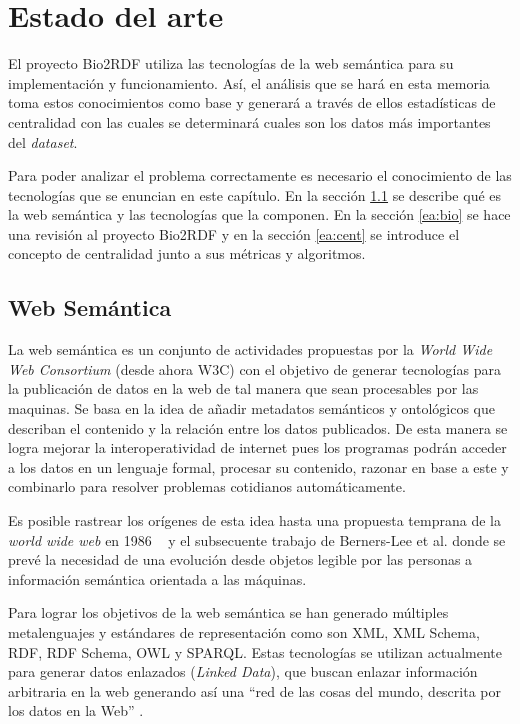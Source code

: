 
\chapter{Estado del arte}
El proyecto Bio2RDF utiliza las tecnologías de la web semántica para su
implementación y funcionamiento. Así, el análisis que se hará en esta memoria
toma estos conocimientos como base y generará a través de ellos estadísticas de
centralidad con las cuales se determinará cuales son los datos más importantes
del \emph{dataset}.

Para poder analizar el problema correctamente es necesario el conocimiento de
las tecnologías que se enuncian en este capítulo. En la sección \ref{ea:ws} se
describe qué es la web semántica y las tecnologías que la componen.
En la sección \ref{ea:bio} se hace una revisión al proyecto Bio2RDF y en la
sección \ref{ea:cent} se introduce el concepto de centralidad junto a sus
métricas y algoritmos.

\section{Web Semántica}\label{ea:ws}
La web semántica es un conjunto de actividades propuestas por la \emph{World
Wide Web Consortium} (desde ahora W3C) con el objetivo de generar tecnologías
para la publicación de datos en la web de tal manera que sean procesables por
las maquinas. 
Se basa en la idea de añadir metadatos semánticos y ontológicos que describan el
contenido y la relación entre los datos publicados. De esta manera se logra
mejorar la interoperatividad de internet pues los programas podrán acceder a los
datos en un lenguaje formal, procesar su contenido, razonar en base a este y
combinarlo para resolver problemas cotidianos automáticamente.

Es posible rastrear los orígenes de esta idea hasta una propuesta temprana de la
\emph{world wide web} en 1986 ~\cite{berners1989proposal} y el subsecuente
trabajo de Berners-Lee et al.\cite{berners1992world} donde se prevé la
necesidad de una evolución desde objetos legible por las personas a información
semántica orientada a las máquinas.

Para lograr los objetivos de la web semántica se han generado múltiples
metalenguajes y estándares de representación como son XML, XML Schema, RDF,
RDF Schema, OWL y SPARQL. Estas tecnologías se utilizan actualmente para generar
datos enlazados (\emph{Linked Data}), que buscan enlazar información arbitraria
en la web generando así una ``red de las cosas del mundo, descrita por los datos
en la Web'' \cite{berners2011linked}.

